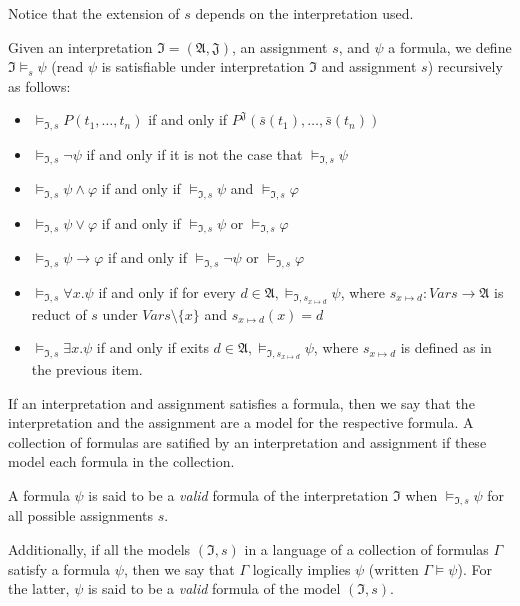 Notice that the extension of $s$ depends on the interpretation used.

\begin{definition}
  Given an interpretation $\mathfrak{I} = (\mathfrak{A}, \mathfrak{J})$, an assignment $s$, and $\psi$ a formula, we define $\mathfrak{I} \models_s \psi$ (read $\psi$ is satisfiable under interpretation $\mathfrak{I}$ and assignment $s$) recursively as follows:
  \begin{itemize}
    \item $\models_{\mathfrak{I}, s} P(t_1, \dots, t_n)$ if and only if $P^{\mathfrak{J}}(\bar{s}(t_1), \dots, \bar{s}(t_n))$
    \item $\models_{\mathfrak{I}, s} \neg \psi$ if and only if  it is not the case that $\models_{\mathfrak{I}, s}   \psi$
    \item $\models_{\mathfrak{I}, s} \psi \land \varphi$ if and only if $\models_{\mathfrak{I}, s}  \psi$ and $   \models_{\mathfrak{I}, s}  \varphi$
    \item $   \models_{\mathfrak{I}, s}  \psi \lor \varphi$ if and only if $   \models_{\mathfrak{I}, s}  \psi$ or $   \models_{\mathfrak{I}, s}  \varphi$
    \item $   \models_{\mathfrak{I}, s}  \psi \rightarrow \varphi$ if and only if $   \models_{\mathfrak{I}, s}  \neg \psi$ or $   \models_{\mathfrak{I}, s}  \varphi$
    \item $   \models_{\mathfrak{I}, s}  \forall x . \psi$ if and only if for every $d \in \mathfrak{A},    \models_{\mathfrak{I}, s_{x \mapsto d}} \psi$, where $s_{x \mapsto d} : Vars \rightarrow \mathfrak{A}$ is reduct of $s$ under $Vars \setminus \{x\}$ and $s_{x \mapsto d}(x) = d$
    \item $   \models_{\mathfrak{I}, s}  \exists x . \psi$ if and only if exits $d \in \mathfrak{A},    \models_{\mathfrak{I}, s_{x \mapsto d}} \psi$, where $s_{x \mapsto d}$ is defined as in the previous item.
  \end{itemize}

If an interpretation and assignment satisfies a formula, then we say that the interpretation and the assignment are a model for the respective formula. A collection of formulas are satified by an interpretation and assignment if these model each formula in the collection.

A formula $\psi$ is said to be a \emph{valid} 
formula of the interpretation $\mathfrak{I}$ 
when $\models_{\mathfrak{I}, s} \psi$ for all 
possible assignments $s$.

Additionally, if all the models $(\mathfrak{I},
s)$ in a language of a collection of formulas 
$\Gamma$ satisfy a formula $\psi$, then we say 
that $\Gamma$ logically implies $\psi$ 
(written $\Gamma \models \psi$). For the 
latter, $\psi$ is said to be a \emph{valid} 
formula of the model $(\mathfrak{I}, s)$.

\end{definition}


